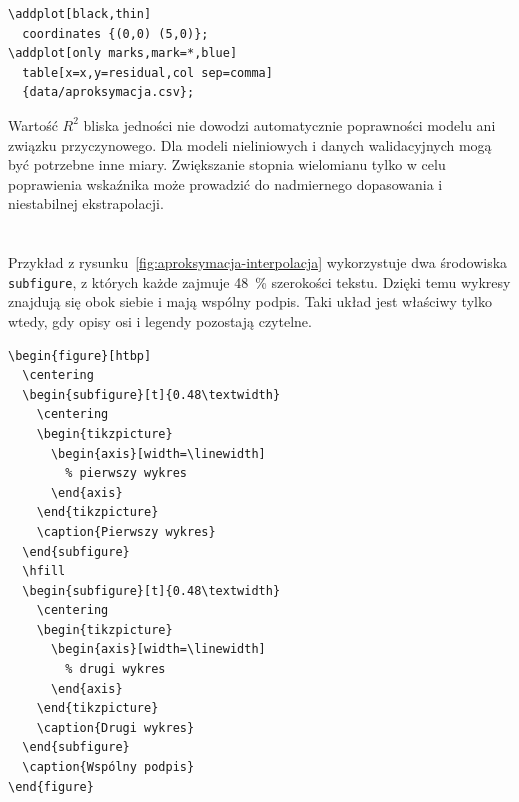 \begin{lstlisting}[caption={\ploren{Wykres reszt modelu}{Residual plot}}]
\addplot[black,thin]
  coordinates {(0,0) (5,0)};
\addplot[only marks,mark=*,blue]
  table[x=x,y=residual,col sep=comma]
  {data/aproksymacja.csv};
\end{lstlisting}

Wartość \(R^2\) bliska jedności nie dowodzi automatycznie poprawności modelu ani związku przyczynowego. Dla modeli nieliniowych i danych walidacyjnych mogą być potrzebne inne miary. Zwiększanie stopnia wielomianu tylko w celu poprawienia wskaźnika może prowadzić do nadmiernego dopasowania i niestabilnej ekstrapolacji.

\section{}

Przykład z rysunku~\ref{fig:aproksymacja-interpolacja} wykorzystuje dwa środowiska \texttt{subfigure}, z których każde zajmuje \SI{48}{\percent} szerokości tekstu. Dzięki temu wykresy znajdują się obok siebie i mają wspólny podpis. Taki układ jest właściwy tylko wtedy, gdy opisy osi i legendy pozostają czytelne.

\begin{lstlisting}[caption={\ploren{Dwa wykresy obok siebie}{Two plots side by side}}]
\begin{figure}[htbp]
  \centering
  \begin{subfigure}[t]{0.48\textwidth}
    \centering
    \begin{tikzpicture}
      \begin{axis}[width=\linewidth]
        % pierwszy wykres
      \end{axis}
    \end{tikzpicture}
    \caption{Pierwszy wykres}
  \end{subfigure}
  \hfill
  \begin{subfigure}[t]{0.48\textwidth}
    \centering
    \begin{tikzpicture}
      \begin{axis}[width=\linewidth]
        % drugi wykres
      \end{axis}
    \end{tikzpicture}
    \caption{Drugi wykres}
  \end{subfigure}
  \caption{Wspólny podpis}
\end{figure}
\end{lstlisting}

